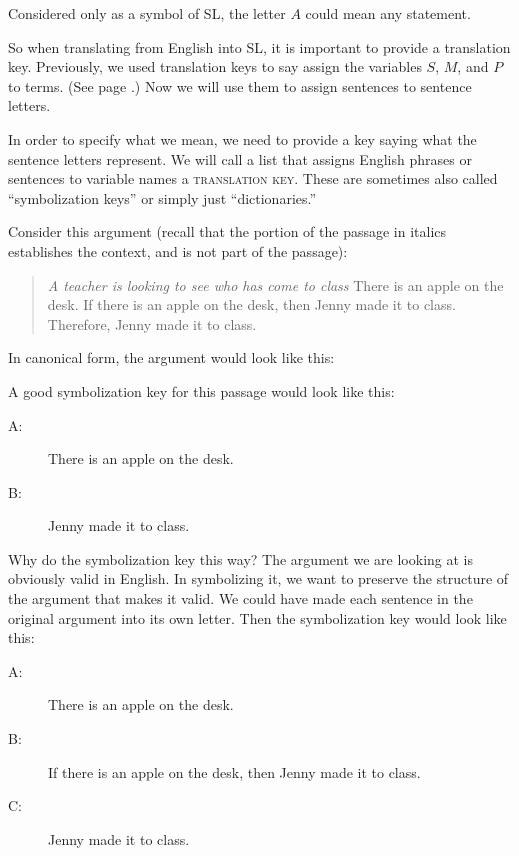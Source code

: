 Considered only as a symbol of SL, the letter $A$ could mean any statement.

So when translating from English into SL, it is important to provide a \gls{translation key}\label{def:translation_key}. Previously, we used translation keys to say assign the variables $S$, $M$, and $P$ to terms. (See page \pageref{def:translation_key}.) Now we will use them to assign sentences to sentence letters.

In order to specify what we mean, we need to provide a key saying what the sentence letters represent. We will call a list that assigns English phrases or sentences to variable names a \textsc{\gls{translation key}}.\label{def:translation_key} These are sometimes also called ``symbolization keys'' or simply just ``dictionaries.''

Consider this argument (recall that the portion of the passage in italics establishes the context, and is not part of the passage):

\begin{quotation}
\noindent \textit{A teacher is looking to see who has come to class} There is an apple on the desk. If there is an apple on the desk, then Jenny made it to class. Therefore, Jenny made it to class.
\end{quotation}

In canonical form, the argument would look like this:

\begin{kormanize}
\end{kormanize}

A good symbolization key for this passage would look like this:

\begin{description}
\item[A:]There is an apple on the desk.
\item[B:]Jenny made it to class.
\end{description}

Why do the symbolization key this way? The argument we are looking at is obviously valid in English. In symbolizing it, we want to preserve the structure of the argument that makes it valid. We could have made each sentence in the original argument into its own letter. Then the symbolization key would look like this:

\begin{description}
\item[A:]There is an apple on the desk.
\item[B:]If there is an apple on the desk, then Jenny made it to class.
\item[C:]Jenny made it to class.
\end{description}

